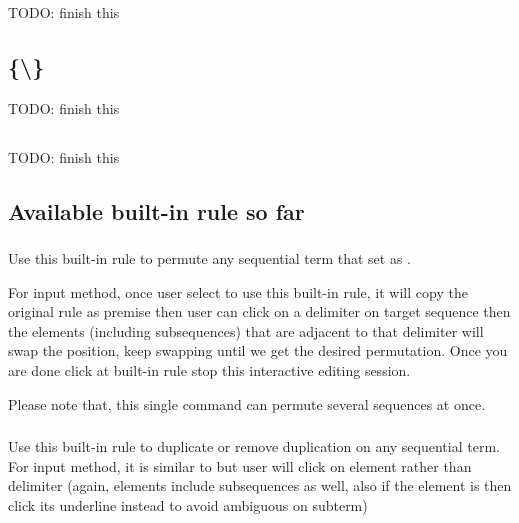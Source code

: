 \documentclass[11pt, a4paper]{article}
\begin{document}
TODO: finish this

\newcommand{\kPremise}{\pkw{premise}}
\newcommand{\kConclude}{\pkw{conclude}}
\newcommand{\kForall}{\pkw{forall}}
\newcommand{\kExists}{\pkw{exists}}
\newcommand{\kIn}{\pkw{in}}
\newcommand{\kConclusionGrammar}{\pkw{conclusion\_grammar}}
\newcommand{\kSubRule}{\pkw{sub\_rule}}
\subsection{\kRule {} \{\kInference \textbackslash \kCompound \} }
TODO: finish this

\newcommand{\kProof}{\pkw{proof}}
\newcommand{\kUseRule}{\pkw{use\_rule}}
\newcommand{\kUseTheorem}{\pkw{use\_theorem}}
\newcommand{\kUseBuiltIn}{\pkw{use\_built\_in}}
\subsection{\kTheorem {}}
TODO: finish this

\subsection{Available built-in rule so far} 

\subsubsection{}
Use this built-in rule to permute any sequential term that set \kCommutative as \kTrue.

For input method, once user select to use this built-in rule, it will copy the original rule as premise then user can click on a delimiter on target sequence then the elements (including subsequences) that are adjacent to that delimiter will swap the position, keep swapping until we get the desired permutation. Once you are done click at built-in rule stop this interactive editing session.

Please note that, this single command can permute several sequences at once.

\subsubsection{}
Use this built-in rule to duplicate or remove duplication on any sequential term. For input method, it is similar to  but user will click on element rather than delimiter (again, elements include subsequences as well, also if the element is  then click its underline instead to avoid ambiguous on subterm)
\end{document}
